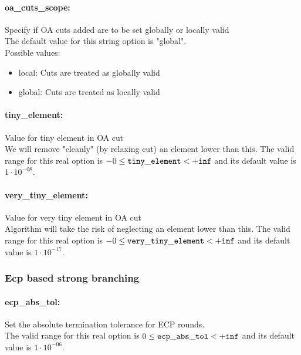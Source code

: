 \paragraph{oa\_cuts\_scope:} Specify if OA cuts added are to be set globally or locally valid $\;$ \\
The default value for this string option is "global".
\\ 
Possible values:
\begin{itemize}
   \item local: Cuts are treated as globally valid
   \item global: Cuts are treated as locally valid
\end{itemize}

\paragraph{tiny\_element:} Value for tiny element in OA cut $\;$ \\
 We will remove "cleanly" (by relaxing cut) an
element lower than this. The valid range for this real option is 
$-0 \le {\tt tiny\_element } <  {\tt +inf}$
and its default value is $1 \cdot 10^{-08}$.


\paragraph{very\_tiny\_element:} Value for very tiny element in OA cut $\;$ \\
 Algorithm will take the risk of neglecting an
element lower than this. The valid range for this real option is 
$-0 \le {\tt very\_tiny\_element } <  {\tt +inf}$
and its default value is $1 \cdot 10^{-17}$.



\subsubsection{Ecp based strong branching}
\label{sec:Bonmin_ecp_based_strong_branching}
\label{sec:bonmin_options_:_Options_for_ecp_cuts_generation}

\paragraph{ecp\_abs\_tol:} Set the absolute termination tolerance for ECP rounds. $\;$ \\
 The valid range for this real option is 
$0 \le {\tt ecp\_abs\_tol } <  {\tt +inf}$
and its default value is $1 \cdot 10^{-06}$.

